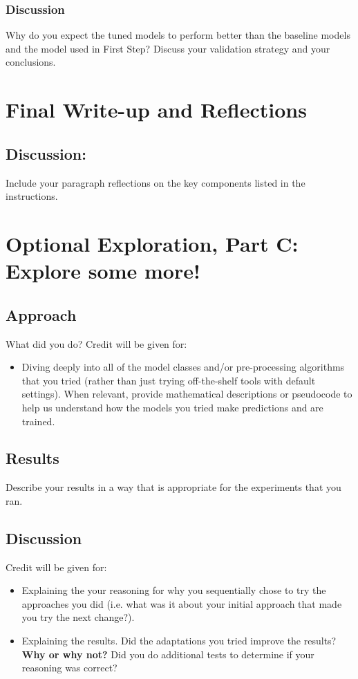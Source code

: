 \documentclass[11pt]{article}
\begin{document}
\subsubsection{Discussion}

Why do you expect the tuned models to perform better than the baseline models and the model used in First Step? Discuss your validation strategy and your conclusions.

\section{Final Write-up and Reflections}

\subsection{Discussion:} 

Include your paragraph reflections on the key components listed in the instructions.


\section{Optional Exploration, Part C: Explore some more!}
\subsection{Approach}

What did you do? Credit will be given for:
  \begin{itemize}
  \item Diving deeply into all of the model classes and/or pre-processing algorithms that you tried (rather than just trying off-the-shelf tools with default settings).  When relevant, provide mathematical descriptions or pseudocode to help us understand how the models you tried make predictions and are trained. 
  \end{itemize}
  

\subsection{Results}

Describe your results in a way that is appropriate for the experiments that you ran.

\subsection{Discussion}
Credit will be given for:

  \begin{itemize}
  \item Explaining the your reasoning for why you sequentially chose to
    try the approaches you did (i.e. what was it about your initial
    approach that made you try the next change?).  
  \item Explaining the results.  Did the adaptations you tried improve
    the results?  \textbf{Why or why not?}  Did you do additional tests to
    determine if your reasoning was correct?  
  \end{itemize}
 
\end{document}
